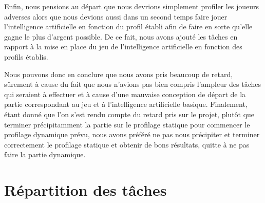 \documentclass{report}
\begin{document}
Enfin, nous pensions au départ que nous devrions simplement profiler les joueurs adverses alors que nous devions aussi dans un second temps faire jouer l'intelligence artificielle en fonction du profil établi afin de faire en sorte qu'elle gagne le plus d'argent possible. De ce fait, nous avons ajouté les tâches en rapport à la mise en place du jeu de l'intelligence artificielle en fonction des profils établis. \par

Nous pouvons donc en conclure que nous avons pris beaucoup de retard, sûrement à cause du fait que nous n'avions pas bien compris l'ampleur des tâches qui seraient à effectuer et à cause d'une mauvaise conception de départ de la partie correspondant au jeu et à l'intelligence artificielle basique. Finalement, étant donné que l'on s'est rendu compte du retard pris sur le projet, plutôt que terminer précipitamment la partie sur le profilage statique pour commencer le profilage dynamique prévu, nous avons préféré ne pas nous précipiter et terminer correctement le profilage statique et obtenir de bons résultats, quitte à ne pas faire la partie dynamique. \par


\section{Répartition des tâches}
\end{document}
